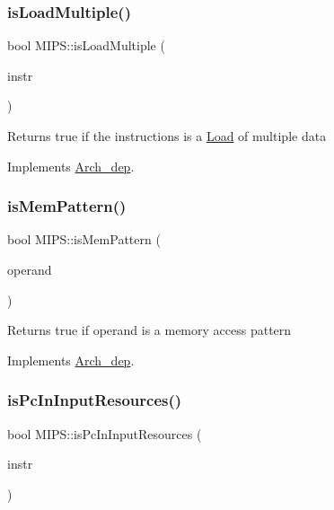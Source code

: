 \mbox{\label{classMIPS_aeb0b38a8be26d938889beb59ee1a98fb}} 
\subsubsection{\texorpdfstring{is\+Load\+Multiple()}{isLoadMultiple()}}
{\footnotesize\ttfamily bool M\+I\+P\+S\+::is\+Load\+Multiple (\begin{DoxyParamCaption}\item[{const string \&}]{instr }\end{DoxyParamCaption})\hspace{0.3cm}{\ttfamily [virtual]}}

Returns true if the instructions is a \hyperlink{classLoad}{Load} of multiple data 

Implements \hyperlink{classArch__dep_a1d8126e04db14a502e3b26be2f032552}{Arch\+\_\+dep}.

\mbox{\label{classMIPS_a73e4206a1a7c2ee6461520c52fa5dcde}} 
\subsubsection{\texorpdfstring{is\+Mem\+Pattern()}{isMemPattern()}}
{\footnotesize\ttfamily bool M\+I\+P\+S\+::is\+Mem\+Pattern (\begin{DoxyParamCaption}\item[{const string \&}]{operand }\end{DoxyParamCaption})\hspace{0.3cm}{\ttfamily [virtual]}}

Returns true if operand is a memory access pattern 

Implements \hyperlink{classArch__dep_aa965a7ac1af14109f60aa2ceab99b6d6}{Arch\+\_\+dep}.

\mbox{\label{classMIPS_affd67799c774ea1ca747f15d7a483a8c}} 
\subsubsection{\texorpdfstring{is\+Pc\+In\+Input\+Resources()}{isPcInInputResources()}}
{\footnotesize\ttfamily bool M\+I\+P\+S\+::is\+Pc\+In\+Input\+Resources (\begin{DoxyParamCaption}\item[{const \hyperlink{classObjdumpInstruction}{Objdump\+Instruction} \&}]{instr }\end{DoxyParamCaption})\hspace{0.3cm}{\ttfamily [virtual]}}

